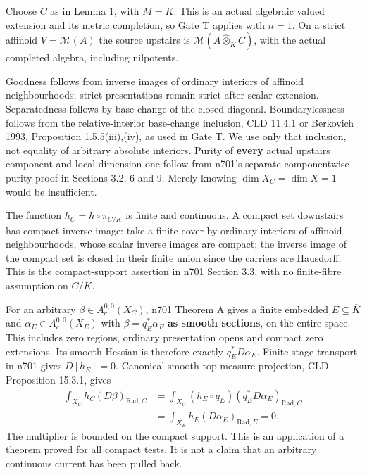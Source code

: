 \documentclass[
  11pt,
]{article}
\begin{document}
Choose \(C\) as in Lemma 1, with \(M=\overline K\). This is an actual
algebraic valued extension and its metric completion, so Gate T applies
with \(n=1\). On a strict affinoid \(V=\mathcal M(A)\) the source
upstairs is \(\mathcal M(A\widehat\otimes_K C)\), with the actual
completed algebra, including nilpotents.

Goodness follows from inverse images of ordinary interiors of affinoid
neighbourhoods; strict presentations remain strict after scalar
extension. Separatedness follows by base change of the closed diagonal.
Boundarylessness follows from the relative-interior base-change
inclusion, CLD 11.4.1 or Berkovich 1993, Proposition 1.5.5(iii),(iv), as
used in Gate T. We use only that inclusion, not equality of arbitrary
absolute interiors. Purity of \textbf{every} actual upstairs component
and local dimension one follow from n701's separate componentwise purity
proof in Sections 3.2, 6 and 9. Merely knowing \(\dim X_C=\dim X=1\)
would be insufficient.

The function \(h_C=h\circ\pi_{C/K}\) is finite and continuous. A compact
set downstairs has compact inverse image: take a finite cover by
ordinary interiors of affinoid neighbourhoods, whose scalar inverse
images are compact; the inverse image of the compact set is closed in
their finite union since the carriers are Hausdorff. This is the
compact-support assertion in n701 Section 3.3, with no finite-fibre
assumption on \(C/K\).

For an arbitrary \(\beta\in A_c^{0,0}(X_C)\), n701 Theorem A gives a
finite embedded \(E\subseteq\overline K\) and
\(\alpha_E\in A_c^{0,0}(X_E)\) with \(\beta=q_E^*\alpha_E\) \textbf{as
smooth sections}, on the entire space. This includes zero regions,
ordinary presentation opens and compact zero extensions. Its smooth
Hessian is therefore exactly \(q_E^*D\alpha_E\). Finite-stage transport
in n701 gives \(D[h_E]=0\). Canonical smooth-top-measure projection, CLD
Proposition 15.3.1, gives \[
 \begin{aligned}
 \int_{X_C}h_C(D\beta)_{\mathrm{Rad},C}
 &=\int_{X_C}(h_E\circ q_E)(q_E^*D\alpha_E)_{\mathrm{Rad},C}\\
 &=\int_{X_E}h_E(D\alpha_E)_{\mathrm{Rad},E}=0.          \tag{5}
 \end{aligned}
\] The multiplier is bounded on the compact support. This is an
application of a theorem proved for all compact tests. It is not a claim
that an arbitrary continuous current has been pulled back.
\end{document}

